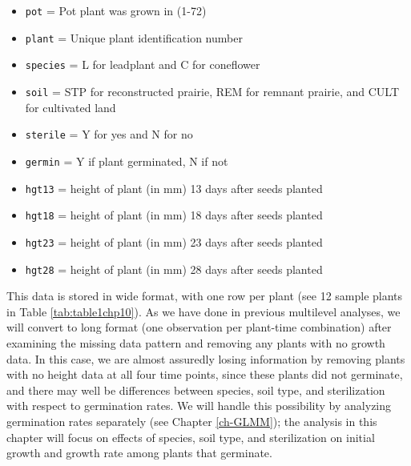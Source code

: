 \documentclass[
]{krantz}
\providecommand{\tightlist}{%
  \setlength{\itemsep}{0pt}\setlength{\parskip}{0pt}}
\begin{document}
\begin{itemize}
\tightlist
\item
  \texttt{pot} = Pot plant was grown in (1-72)
\item
  \texttt{plant} = Unique plant identification number
\item
  \texttt{species} = L for leadplant and C for coneflower
\item
  \texttt{soil} = STP for reconstructed prairie, REM for remnant prairie, and CULT for cultivated land
\item
  \texttt{sterile} = Y for yes and N for no
\item
  \texttt{germin} = Y if plant germinated, N if not
\item
  \texttt{hgt13} = height of plant (in mm) 13 days after seeds planted
\item
  \texttt{hgt18} = height of plant (in mm) 18 days after seeds planted
\item
  \texttt{hgt23} = height of plant (in mm) 23 days after seeds planted
\item
  \texttt{hgt28} = height of plant (in mm) 28 days after seeds planted
\end{itemize}

This data is stored in wide format, with one row per plant (see 12 sample plants in Table \ref{tab:table1chp10}). As we have done in previous multilevel analyses, we will convert to long format (one observation per plant-time combination) after examining the missing data pattern and removing any plants with no growth data. In this case, we are almost assuredly losing information by removing plants with no height data at all four time points, since these plants did not germinate, and there may well be differences between species, soil type, and sterilization with respect to germination rates. We will handle this possibility by analyzing germination rates separately (see Chapter \ref{ch-GLMM}); the analysis in this chapter will focus on effects of species, soil type, and sterilization on initial growth and growth rate among plants that germinate.
\end{document}
